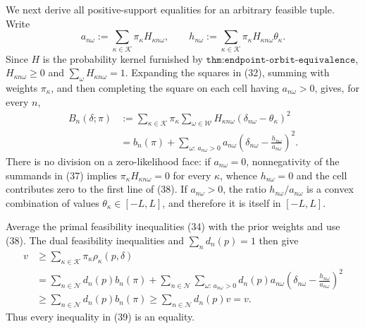 We next derive all positive-support equalities for an arbitrary feasible tuple.  Write
\[
 a_{n\omega}:=\sum_{\kappa\in\mathcal K}
                  \pi_\kappa H_{\kappa n\omega},
 \qquad
 h_{n\omega}:=\sum_{\kappa\in\mathcal K}
                  \pi_\kappa H_{\kappa n\omega}\theta_\kappa.           \tag{37}
\]
Since \(H\) is the probability kernel furnished by \(\texttt{thm:endpoint-orbit-equivalence}\), \(H_{\kappa n\omega}\ge0\) and \(\sum_\omega H_{\kappa n\omega}=1\).  Expanding the squares in (32), summing with weights \(\pi_\kappa\), and then completing the square on each cell having \(a_{n\omega}>0\), gives, for every \(n\),
\[
\begin{aligned}
 B_n(\delta;\pi)
 &:=\sum_{\kappa\in\mathcal K}\pi_\kappa
       \sum_{\omega\in\mathcal W}H_{\kappa n\omega}
       (\delta_{n\omega}-\theta_\kappa)^2 \\
 &= b_n(\pi)
   +\sum_{\omega:\,a_{n\omega}>0}a_{n\omega}
      \left(\delta_{n\omega}-\frac{h_{n\omega}}{a_{n\omega}}\right)^2.   \tag{38}
\end{aligned}
\]
There is no division on a zero-likelihood face: if \(a_{n\omega}=0\), nonnegativity of the summands in (37) implies
\(\pi_\kappa H_{\kappa n\omega}=0\) for every \(\kappa\), whence \(h_{n\omega}=0\) and the cell contributes zero to the first line of (38).  If \(a_{n\omega}>0\), the ratio \(h_{n\omega}/a_{n\omega}\) is a convex combination of values \(\theta_\kappa\in[-L,L]\), and therefore it is itself in \([-L,L]\).

Average the primal feasibility inequalities (34) with the prior weights and use (38).  The dual feasibility inequalities and \(\sum_n d_n(p)=1\) then give
\[
\begin{aligned}
 v
 &\ge \sum_{\kappa\in\mathcal K}\pi_\kappa
          \rho_\kappa(p,\delta) \\
 &=\sum_{n\in\mathcal N}d_n(p)b_n(\pi)
   +\sum_{n\in\mathcal N}\sum_{\omega:\,a_{n\omega}>0}
       d_n(p)a_{n\omega}
       \left(\delta_{n\omega}-\frac{h_{n\omega}}{a_{n\omega}}\right)^2 \\
 &\ge\sum_{n\in\mathcal N}d_n(p)b_n(\pi)
 \ge\sum_{n\in\mathcal N}d_n(p)v=v.                                      \tag{39}
\end{aligned}
\]
Thus every inequality in (39) is an equality.

